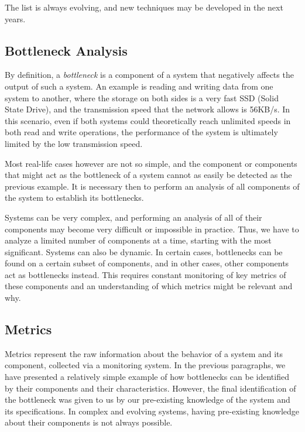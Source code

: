 The list is always evolving, and new techniques may be developed in the next years.

\subsection{Bottleneck Analysis}

By definition, a \textit{bottleneck} is a component of a system that negatively affects the output of such a system.
An example is reading and writing data from one system to another, where the storage on both sides is a very fast SSD (Solid State Drive), and the transmission speed that the network allows is 56KB/s.
In this scenario, even if both systems could theoretically reach unlimited speeds in both read and write operations, the performance of the system is ultimately limited by the low transmission speed.

Most real-life cases however are not so simple, and the component or components that might act as the bottleneck of a system cannot as easily be detected as the previous example.
It is necessary then to perform an analysis of all components of the system to establish its bottlenecks.

Systems can be very complex, and performing an analysis of all of their components may become very difficult or impossible in practice.
Thus, we have to analyze a limited number of components at a time, starting with the most significant.
Systems can also be dynamic.
In certain cases, bottlenecks can be found on a certain subset of components, and in other cases, other components act as bottlenecks instead.
This requires constant monitoring of key metrics of these components and an understanding of which metrics might be relevant and why.

\subsection{Metrics}

Metrics represent the raw information about the behavior of a system and its component, collected via a monitoring system.
In the previous paragraphs, we have presented a relatively simple example of how bottlenecks can be identified by their components and their characteristics.
However, the final identification of the bottleneck was given to us by our pre-existing knowledge of the system and its specifications.
In complex and evolving systems, having pre-existing knowledge about their components is not always possible.

